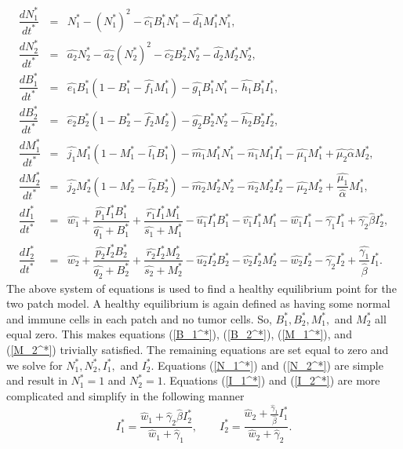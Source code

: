 \documentclass[letter,10pt]{article}
\begin{document}
\begin{eqnarray}
\dfrac{dN_1^*}{dt^*}&=&N_1^* - (N_1^*)^2 - \hat{c_1}B_1^*N_1^*-\hat{d_1}M_1^*N_1^*, \label{N_1^*}\\
\dfrac{dN_2^*}{dt^*}&=&\hat{a_2}N_2^* -\hat{a_2} (N_2^*)^2 - \hat{c_2}B_2^*N_2^*-\hat{d_2}M_2^*N_2^*, \label{N_2^*}\\
\dfrac{dB_1^*}{dt^*}&=&\hat{e_1}B_1^*(1-B_1^*-\hat{f_1}M_1^*)-\hat{g_1}B_1^*N_1^*-\hat{h_1}B_1^*I_1^*, \label{B_1^*}\\
\dfrac{dB_2^*}{dt^*}&=&\hat{e_2}B_2^*(1-B_2^*-\hat{f_2}M_2^*)-\hat{g_2}B_2^*N_2^*-\hat{h_2}B_2^*I_2^*, \label{B_2^*}\\
\dfrac{dM_1^*}{dt^*}&=&\hat{j_1}M_1^*(1-M_1^*-\hat{l_1}B_1^*)-\hat{m_1}M_1^*N_1^*- \hat{n_1}M_1^*I_1^*-\hat{\mu_1}M_1^*+\hat{\mu_2}\hat{\alpha}M_2^*, \label{M_1^*}\\
\dfrac{dM_2^*}{dt^*}&=&\hat{j_2}M_2^*(1-M_2^*-\hat{l_2}B_2^*)-\hat{m_2}M_2^*N_2^*-\hat{n_2}M_2^*I_2^*-\hat{\mu_2}M_2^*+ \dfrac{\hat{\mu_1}}{\hat{\alpha}}M_1^*, \label{M_2^*}\\
\dfrac{dI_1^*}{dt^*}&=&\hat{w_1}+\dfrac{\hat{p_1}I_1^*B_1^*}{\hat{q_1}+B_1^*}+\dfrac{\hat{r_1}I_1^*M_1^*}{\hat{s_1}+M_1^*}-\hat{u_1}I_1^*B_1^*-\hat{v_1}I_1^*M_1^*-\hat{w_1}I_1^*- \hat{\gamma_1}I_1^*+\hat{\gamma_2}\hat{\beta}I_2^*, \label{I_1^*}\\
\dfrac{dI_2^*}{dt^*}&=&\hat{w_2}+\dfrac{\hat{p_2}I_2^*B_2^*}{\hat{q_2}+B_2^*}+\dfrac{\hat{r_2}I_2^*M_2^*}{\hat{s_2}+M_2^*}-\hat{u_2}I_2^*B_2^*-\hat{v_2}I_2^*M_2^*-\hat{w_2}I_2^*- \hat{\gamma_2}I_2^*+\dfrac{\hat{\gamma_1}}{\hat{\beta}}I_1^*. \label{I_2^*}
\end{eqnarray}
The above system of equations is used to find a healthy equilibrium point for the two patch model. A healthy equilibrium is again defined as having some normal and immune cells in each patch and no tumor cells. So, $B_1^*, B_2^*, M_1^*,$ and $M_2^*$ all equal zero. This makes equations (\ref{B_1^*}), (\ref{B_2^*}), (\ref{M_1^*}), and (\ref{M_2^*}) trivially satisfied. The remaining equations are set equal to zero and we solve for $N_1^*, N_2^*, I_1^*,$ and $I_2^*$. Equations (\ref{N_1^*}) and (\ref{N_2^*}) are simple and result in $N_1^*=1$ and $N_2^*=1$. Equations (\ref{I_1^*}) and (\ref{I_2^*}) are more complicated and simplify in the following manner
\begin{equation*}
I_1^* = \dfrac{\hat{w}_1+\hat{\gamma}_2\hat{\beta}I_2^*}{\hat{w}_1+\hat{\gamma}_1}, \qquad
I_2^* = \dfrac{\hat{w}_2+\frac{\hat{\gamma}_1}{\hat{\beta}}I_1^*}{\hat{w}_2+\hat{\gamma}_2}.
\end{equation*}
\end{document}
